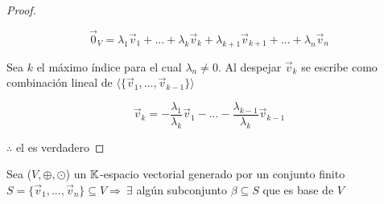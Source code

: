 \begin{proof}
\begin{enumerate}
\begin{enumerate}
        \begin{equation*}
            {\vec{0}}_{V} = {\lambda}_{1}{\vec{v}}_{1} + ... + {\lambda}_{k}{\vec{v}}_{k} + {\lambda}_{k+1}{\vec{v}}_{k+1}+ ... + {\lambda}_{n}{\vec{v}}_{n}
        \end{equation*}

        Sea $k$ el máximo índice para el cual ${\lambda}_{n} \neq 0$. Al despejar  ${\vec{v}}_{k}$ se escribe como combinación lineal de $ \langle \{{\vec{v}}_{1},...,{\vec{v}}_{k-1}\} \rangle$

        \begin{equation*}
            {\vec{v}}_{k} = -\frac{{\lambda}_{1}}{{\lambda}_{k}}{\vec{v}}_{1} - ... -\frac{{\lambda}_{k-1}}{{\lambda}_{k}}{\vec{v}}_{k-1}
        \end{equation*}
        \end{enumerate}
        
    \end{enumerate}
    $\therefore$ el  es verdadero
\end{proof}

\begin{theorem} \label{teo118}
     Sea ($V, \oplus, \odot$) un $\mathbb{K}$-espacio vectorial generado por un conjunto finito $S = \{{\vec{v}}_{1},...,{\vec{v}}_{n} \} \subseteq V \Rightarrow \: \exists$ algún subconjunto $\beta \subseteq S$ que es base de $V$
\end{theorem}

